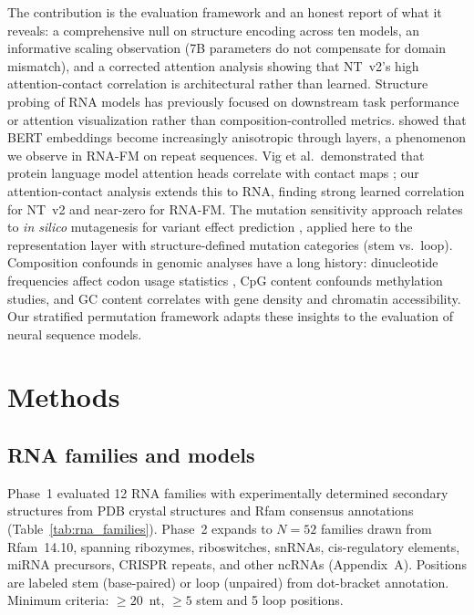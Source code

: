 \documentclass[11pt]{article}
\begin{document}
The contribution is the evaluation framework and an honest report of
what it reveals: a comprehensive null on structure encoding across
ten models, an informative scaling observation (7B parameters do not
compensate for domain mismatch), and a corrected attention analysis
showing that NT~v2's high attention-contact correlation is
architectural rather than learned.  Structure probing of RNA models has previously focused on
downstream task performance \citep{rnafm,dalla2023nucleotide} or
attention visualization rather than composition-controlled metrics.
\citet{ethayarajh2019} showed that BERT embeddings become increasingly
anisotropic through layers, a phenomenon we observe in RNA-FM on
repeat sequences.  Vig et al.\ demonstrated that protein language
model attention heads correlate with contact maps
\citep{vig2020bertology}; our attention-contact analysis extends this
to RNA, finding strong learned correlation for NT~v2 and near-zero
for RNA-FM.  The mutation sensitivity approach relates to \emph{in
silico} mutagenesis for variant effect prediction
\citep{frazer2021disease}, applied here to the representation layer
with structure-defined mutation categories (stem vs.\ loop).
Composition confounds in genomic analyses have a long history:
dinucleotide frequencies affect codon usage statistics
\citep{karlin1998dinucleotide}, CpG content confounds methylation
studies, and GC content correlates with gene density and chromatin
accessibility.  Our stratified permutation framework adapts these
insights to the evaluation of neural sequence models.


\section{Methods}
\label{sec:methods}

\subsection{RNA families and models}
\label{sec:families_models}

Phase~1 evaluated 12 RNA families with experimentally determined
secondary structures from PDB crystal structures and Rfam consensus
annotations (Table~\ref{tab:rna_families}).  Phase~2 expands to
$N = 52$ families drawn from Rfam~14.10, spanning ribozymes,
riboswitches, snRNAs, cis-regulatory elements, miRNA precursors,
CRISPR repeats, and other ncRNAs (Appendix~A).  Positions are labeled
stem (base-paired) or loop (unpaired) from dot-bracket annotation.
Minimum criteria: $\geq 20$~nt, $\geq 5$ stem and 5 loop positions.
\end{document}
